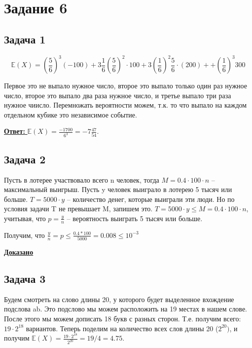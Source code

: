 \documentclass[a4paper,14pt]{article} %
\begin{document}

\section{Задание 6}

\subsection{Задача 1}
\begin{equation*}
	\mathds{E}(X) =  (\frac{5}{6})^3 (-100) 
	+ 3  \frac{1}{6} (\frac{5}{6} )^2 \cdot 100
	+ 3  ( \frac{1}{6} )^2 \frac{5}{6} \cdot (200) +
	+ ( \frac{1}{6} )^3  300
\end{equation*}


Первое это не выпало нужное число, второе это выпало только один раз нужное число, второе это выпало два раза нужное число, и третье выпало три раза нужное чиисло.
Перемножать вероятности можем, т.к. то что выпало на каждом отдельном кубике это независимое событие.

\underline{\textbf{Ответ: }} $\mathds{E}(X) = \frac{-1700}{6^3} = -7\frac{47}{54}$.

\subsection{Задача 2}
Пусть в лотерее участвовало всего n человек, тогда 
\newline $M = 0.4 \cdot 100 \cdot n$ -- максимальный выигрыш.
Пусть y человек выиграло в лотерею 5 тысяч или больше. $T = 5000 \cdot y$ -- количество денег, которые выиграли эти люди.
\newline Но по условия задачи T не превышает M, запишем это. 
\newline $T = 5000 \cdot y \leq M = 0.4 \cdot 100 \cdot n$, учитывая, что $p = \frac{y}{n}$ -- вероятность выиграть 5 тысяч или больше.

Получим, что $\frac{y}{n} = p \leq \frac{0.4 * 100}{5000} = 0.008 \leq 10^{-3}$

\underline{\textbf{Доказано}}

\subsection{Задача 3}
Будем смотреть на слово длины 20, у которого будет выделенное вхождение подслова ab. Это подслово мы можем расположить на 19 местах в нашем слове.
После этого мы можем дописать 18 букв с разных сторон. Т.е. получим всего: $19 \cdot 2^{18}$ вариантов.
\newline
Теперь поделим на количество всех слов длины 20 ($2^{20})$, и получим 
\newline
$\mathds{E}(X) = \frac{19 \cdot 2^{18}}{2^{20}} = 19 / 4 = 4.75$. 
\end{document}
